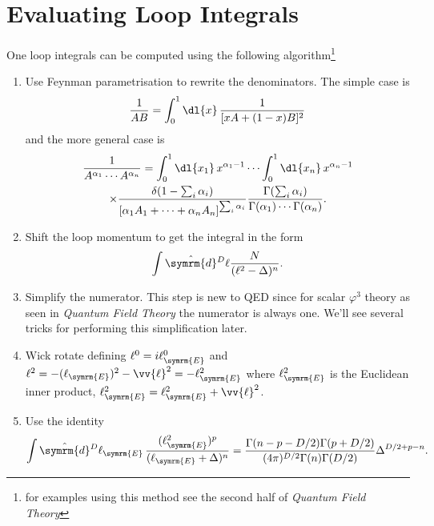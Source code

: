 \documentclass[fleqn]{NotesClass}
\newcommand*{\course}[1]{\textit{#1}}
\newcommand{\dhat}[1]{\hat{\symrm{d}}{#1}}
\begin{document}
    \chapter{Evaluating Loop Integrals}
    One loop integrals can be computed using the following algorithm\footnote{for examples using this method see the second half of \course{Quantum Field Theory}}
    \begin{enumerate}
        \item Use Feynman parametrisation to rewrite the denominators.
        The simple case is
        \begin{equation}
            \frac{1}{AB} = \int_0^1 \dl{x} \, \frac{1}{[xA + (1 - x)B]^2}
        \end{equation}
        and the more general case is
        \begin{multline*}
            \frac{1}{A^{\alpha_1} \dotsm A^{\alpha_n}} = \int_0^1 \dl{x_1} \, x^{\alpha_1 - 1} \dotsm \int_0^1 \dl{x_n} \, x^{\alpha_n - 1}\\
            \times \frac{\delta(1 - \sum_i \alpha_i)}{[\alpha_1 A_1 + \dotsb + \alpha_n A_n]^{\sum_i \alpha_i}} \frac{\Gamma(\sum_i \alpha_i)}{\Gamma(\alpha_1) \dotsm \Gamma(\alpha_n)}.
        \end{multline*}
        \item Shift the loop momentum to get the integral in the form
        \begin{equation}
            \int \dhat{^D\ell} \frac{N}{(\ell^2 - \Delta)^n}.
        \end{equation}
        \item Simplify the numerator. This step is new to QED since for scalar \(\varphi^3\) theory as seen in \course{Quantum Field Theory} the numerator is always one.
        We'll see several tricks for performing this simplification later.
        \item Wick rotate defining \(\ell^0 = i\ell^0_{\symrm{E}}\) and \(\ell^2 = -(\ell_{\symrm{E}})^2 - \vv{\ell}^2 = -\ell_{\symrm{E}}^2\) where \(\ell_{\symrm{E}}^2\) is the Euclidean inner product, \(\ell_{\symrm{E}}^2 = \ell_{\symrm{E}}^2 + \vv{\ell}^2\).
        \item Use the identity
        \begin{equation}
            \int \dhat{^D\ell_{\symrm{E}}} \, \frac{(\ell_{\symrm{E}}^2)^p}{(\ell_{\symrm{E}} + \Delta)^n} = \frac{\Gamma(n - p - D/2)\Gamma(p + D/2)}{(4\pi)^{D/2}\Gamma(n)\Gamma(D/2)} \Delta^{D/2 + p - n}.
        \end{equation}
    \end{enumerate}
    
\end{document}
